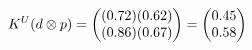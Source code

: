 \documentclass[preview]{standalone}
\begin{document}
\begin{align*}
\special{dvisvgm:raw <g id='unique000'>}K^U(d \otimes p) = \begin{pmatrix} (0.72)(0.62) \\ (0.86)(0.67) \end{pmatrix} = \begin{pmatrix} 0.45 \\ 0.58 \end{pmatrix}\special{dvisvgm:raw </g>}
\end{align*}
\end{document}
